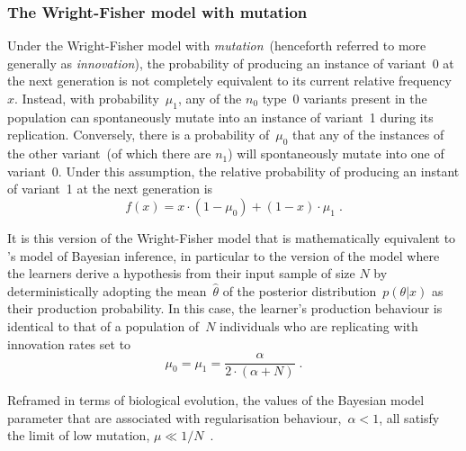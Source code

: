 \subsubsection{The Wright-Fisher model with mutation}
\label{sec:realigriffithsequivalence}


Under the Wright-Fisher model with \emph{mutation}~(henceforth referred to more generally as \emph{innovation}), the probability of producing an instance of variant~$0$ at the next generation is not completely equivalent to its current relative frequency~$x$. Instead, with probability~$\mu_{1}$, any of the $n_0$ type~0 variants present in the population can spontaneously mutate into an instance of variant~1 during its replication. Conversely, there is a probability of~$\mu_{0}$ that any of the instances of the other variant~(of which there are $n_1$) will spontaneously mutate into one of variant~0. Under this assumption, the relative probability of producing an instant of variant~1 at the next generation is
\begin{equation}\label{eq:mutation}
f(x) = x\cdot(1-\mu_0) + (1-x)\cdot\mu_1 \;.
\end{equation}

It is this version of the Wright-Fisher model that is mathematically equivalent to \citeauthor{Reali2010}'s model of Bayesian inference, in particular to the version of the model where the learners derive a hypothesis from their input sample of size $N$ by deterministically adopting the mean~$\hat{\theta}$ of the posterior distribution~$p(\theta|x)$ as their production probability. In this case, the learner's production behaviour is identical to that of a population of~$N$ individuals who are replicating with innovation rates set to
\begin{equation}\label{eq:realigriffithsequivalence}
\mu_0 = \mu_1 = \frac{\alpha}{2\cdot(\alpha+N)}\;.
\end{equation}


Reframed in terms of biological evolution, the values of the Bayesian model parameter that are associated with regularisation behaviour,~$\alpha < 1$, all satisfy the limit of low mutation, $\mu \ll 1/N$~\citep{Tarnita2014}.

